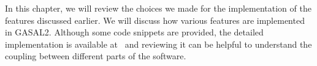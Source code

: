 In this chapter, we will review the choices we made for the implementation of the features discussed earlier. We will discuss how various features are implemented in GASAL2. Although some code snippets are provided, the detailed implementation is available at~\cite{j-levy:bwa-gasal2} and reviewing it can be helpful to understand the coupling between different parts of the software.